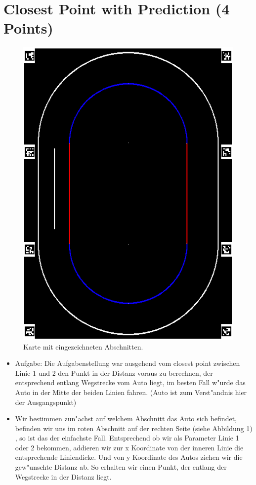 \documentclass[10pt,oneside,a4paper]{article}
\begin{document}
  \section{Closest Point with Prediction (4 Points)}
    \begin{figure}[h]
      \centering
      \includegraphics[scale=0.5]{pictures/map.png}
      \caption{Karte mit eingezeichneten Abschnitten.}
    \end{figure}
    \begin{itemize}
      \item{Aufgabe:} Die Aufgabenstellung war ausgehend vom closest point zwischen Linie 1 und 2 den Punkt in der Distanz voraus zu berechnen, der entsprechend entlang Wegstrecke vom Auto liegt, im besten Fall w"urde das Auto in der Mitte der beiden Linien fahren. (Auto ist zum Verst"andnis hier der Ausgangspunkt)
    \end{itemize}
    \begin{itemize}
      \item Wir bestimmen zun"achst auf welchem Abschnitt das Auto sich befindet, befinden wir uns im roten Abschnitt auf der rechten Seite (siehe Abbildung 1) , so ist das der einfachste Fall. 
      Entsprechend ob wir als Parameter Linie 1 oder 2 bekommen, addieren wir zur x Koordinate von der inneren Linie die entsprechende Liniendicke. Und von y Koordinate des Autos ziehen wir die gew"unschte Distanz ab. So erhalten wir einen Punkt, der entlang der Wegstrecke in der Distanz liegt. 
    \end{itemize}
\end{document}
